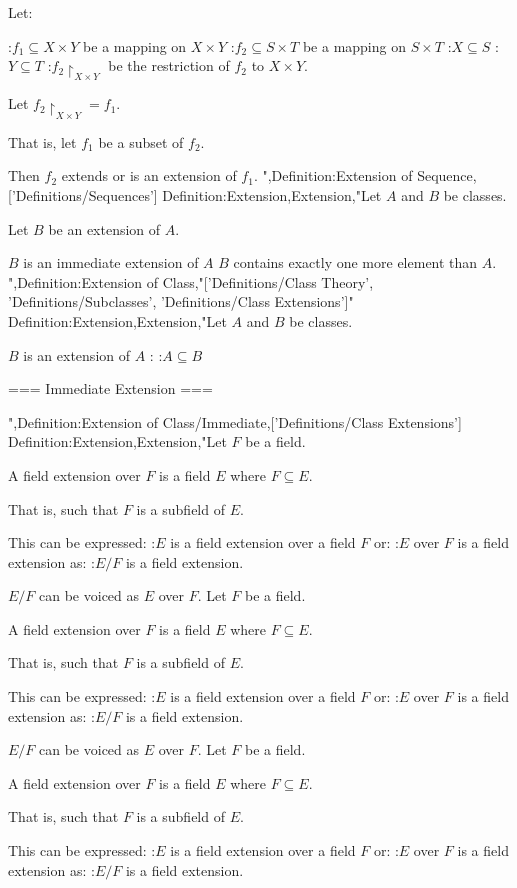 Let:

:$f_1 \subseteq X \times Y$ be a mapping on $X \times Y$
:$f_2 \subseteq S \times T$ be a mapping on $S \times T$
:$X \subseteq S$
:$Y \subseteq T$
:$f_2 \restriction_{X \times Y}$ be the restriction of $f_2$ to $X \times Y$.


Let $f_2 \restriction_{X \times Y} = f_1$.

That is, let $f_1$ be a subset of $f_2$.


Then $f_2$ extends or is an extension of $f_1$.
",Definition:Extension of Sequence,['Definitions/Sequences']
Definition:Extension,Extension,"Let $A$ and $B$ be classes.

Let $B$ be an extension of $A$.

$B$ is an immediate extension of $A$  $B$ contains exactly one more element than $A$.
",Definition:Extension of Class,"['Definitions/Class Theory', 'Definitions/Subclasses', 'Definitions/Class Extensions']"
Definition:Extension,Extension,"Let $A$ and $B$ be classes.

$B$ is an extension of $A$ :
:$A \subseteq B$


=== Immediate Extension ===

",Definition:Extension of Class/Immediate,['Definitions/Class Extensions']
Definition:Extension,Extension,"Let $F$ be a field.


A field extension over $F$ is a field $E$ where $F \subseteq E$.

That is, such that $F$ is a subfield of $E$.


This can be expressed:
:$E$ is a field extension over a field $F$
or:
:$E$ over $F$ is a field extension 
as:
:$E / F$ is a field extension.  


$E / F$ can be voiced as $E$ over $F$.
Let $F$ be a field.


A field extension over $F$ is a field $E$ where $F \subseteq E$.

That is, such that $F$ is a subfield of $E$.


This can be expressed:
:$E$ is a field extension over a field $F$
or:
:$E$ over $F$ is a field extension 
as:
:$E / F$ is a field extension.  


$E / F$ can be voiced as $E$ over $F$.
Let $F$ be a field.


A field extension over $F$ is a field $E$ where $F \subseteq E$.

That is, such that $F$ is a subfield of $E$.


This can be expressed:
:$E$ is a field extension over a field $F$
or:
:$E$ over $F$ is a field extension 
as:
:$E / F$ is a field extension.  


